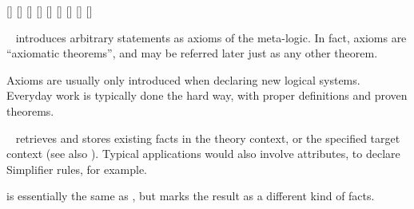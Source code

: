 \begin{isabellebody}
\begin{isamarkuptext}
  \begin{railoutput}
[]
\rail@plus
{}[]
[]
\rail@endplus
\rail@end
{}
\rail@bar
{}[]
[]
\rail@endbar
\rail@bar
{}
[]
\rail@endbar
\rail@plus
\rail@bar
{}
[]
\rail@endbar
{}[]
[]
\rail@endplus
\rail@end
\end{railoutput}


  \begin{description}
  
  \item \hyperlink{command.axioms}{\mbox{}}~ introduces arbitrary
  statements as axioms of the meta-logic.  In fact, axioms are
  ``axiomatic theorems'', and may be referred later just as any other
  theorem.
  
  Axioms are usually only introduced when declaring new logical
  systems.  Everyday work is typically done the hard way, with proper
  definitions and proven theorems.
  
  \item \hyperlink{command.lemmas}{\mbox{}}~ retrieves and stores
  existing facts in the theory context, or the specified target
  context (see also ).  Typical applications would
  also involve attributes, to declare Simplifier rules, for example.
  
  \item \hyperlink{command.theorems}{\mbox{}} is essentially the same as \hyperlink{command.lemmas}{\mbox{}}, but marks the result as a different kind of facts.


\end{description}
\end{isamarkuptext}
\end{isabellebody}
